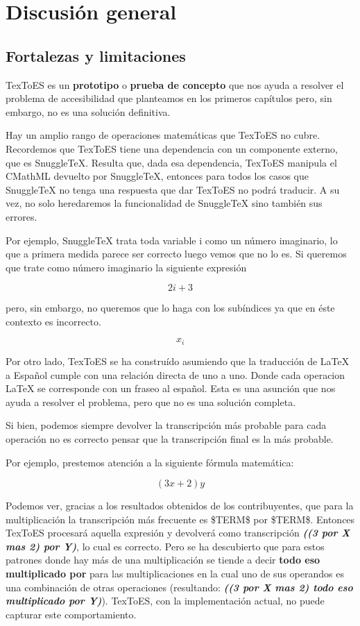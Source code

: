 \chapter{Discusión general}

\label{Chapter5}

\section{Fortalezas y limitaciones}
TexToES es un \textbf{prototipo} o \textbf{prueba de concepto} que nos ayuda a resolver el problema de accesibilidad que planteamos en los primeros capítulos pero, sin embargo, no es una solución definitiva.

Hay un amplio rango de operaciones matemáticas que TexToES no cubre. Recordemos que TexToES tiene una dependencia con un componente externo, que es SnuggleTeX. Resulta que, dada esa dependencia, TexToES manipula el CMathML devuelto por SnuggleTeX, entonces para todos los casos que SnuggleTeX no tenga una respuesta que dar TexToES no podrá traducir. A su vez, no solo heredaremos la funcionalidad de SnuggleTeX sino también sus errores.

Por ejemplo, SnuggleTeX trata toda variable i como un número imaginario, lo que a primera medida parece ser correcto luego vemos que no lo es. Si queremos que trate como número imaginario la siguiente expresión

$$2i + 3$$

pero, sin embargo, no queremos que lo haga con los subíndices ya que en éste contexto es incorrecto.

$$x_i$$

Por otro lado, TexToES se ha construído asumiendo que la traducción de LaTeX a Español cumple con una relación directa de uno a uno. Donde cada operacion LaTeX se corresponde con un fraseo al español. Esta es una asunción que nos ayuda a resolver el problema, pero que no es una solución completa.

Si bien, podemos siempre devolver la transcripción más probable para cada operación no es correcto pensar que la transcripción final es la más probable.

Por ejemplo, prestemos atención a la siguiente fórmula matemática:

$$ (3x + 2) y $$

Podemos ver, gracias a los resultados obtenidos de los contribuyentes, que para la multiplicación la transcripción más frecuente es \$TERM\$ por \$TERM\$. Entonces TexToES procesará aquella expresión y devolverá como transcripción \textbf{\textit{((3 por X mas 2) por Y)}}, lo cual es correcto. Pero se ha descubierto que para estos patrones donde hay más de una multiplicación se tiende a decir \textbf{todo eso multiplicado por} para las multiplicaciones en la cual uno de sus operandos es una combinación de otras operaciones (resultando: \textbf{\textit{((3 por X mas 2) todo eso multiplicado por Y)}}). TexToES, con la implementación actual, no puede capturar este comportamiento.

